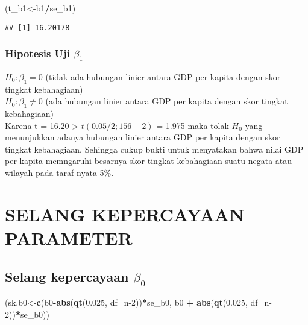 \documentclass[
]{article}
\newenvironment{Shaded}{\begin{snugshade}}{\end{snugshade}}
\newcommand{\AttributeTok}[1]{\textcolor[rgb]{0.13,0.29,0.53}{#1}}
\newcommand{\DecValTok}[1]{\textcolor[rgb]{0.00,0.00,0.81}{#1}}
\newcommand{\FloatTok}[1]{\textcolor[rgb]{0.00,0.00,0.81}{#1}}
\newcommand{\FunctionTok}[1]{\textcolor[rgb]{0.13,0.29,0.53}{\textbf{#1}}}
\newcommand{\NormalTok}[1]{#1}
\newcommand{\OtherTok}[1]{\textcolor[rgb]{0.56,0.35,0.01}{#1}}
\newcommand{\SpecialCharTok}[1]{\textcolor[rgb]{0.81,0.36,0.00}{\textbf{#1}}}
\begin{document}
\begin{Shaded}
\begin{Highlighting}[]
\NormalTok{(t\_b1}\OtherTok{\textless{}{-}}\NormalTok{b1}\SpecialCharTok{/}\NormalTok{se\_b1)}
\end{Highlighting}
\end{Shaded}

\begin{verbatim}
## [1] 16.20178
\end{verbatim}

\hypertarget{hipotesis-uji-beta_1}{%
\subsubsection{\texorpdfstring{ Hipotesis Uji
\(\beta_1\)}{ Hipotesis Uji \textbackslash beta\_1}}\label{hipotesis-uji-beta_1}}

\(H_0:\beta_1=0\) (tidak ada hubungan linier antara GDP per kapita
dengan skor tingkat kebahagiaan)\\
\(H_0:\beta_1≠0\) (ada hubungan linier antara GDP per kapita dengan skor
tingkat kebahagiaan)\\
Karena t = 16.20 \textgreater{} \(t(0.05/2;156-2)\) = 1.975 maka tolak
\(H_0\) yang menunjukkan adanya hubungan linier antara GDP per kapita
dengan skor tingkat kebahagiaan. Sehingga cukup bukti untuk menyatakan
bahwa nilai GDP per kapita memngaruhi besarnya skor tingkat kebahagiaan
suatu negata atau wilayah pada taraf nyata 5\%.

\hypertarget{selang-kepercayaan-parameter}{%
\section{\texorpdfstring{ SELANG KEPERCAYAAN
PARAMETER}{ SELANG KEPERCAYAAN PARAMETER}}\label{selang-kepercayaan-parameter}}

\hypertarget{selang-kepercayaan-beta_0}{%
\subsection{\texorpdfstring{ Selang kepercayaan
\(\beta_0\)}{ Selang kepercayaan \textbackslash beta\_0}}\label{selang-kepercayaan-beta_0}}

\begin{Shaded}
\begin{Highlighting}[]
\NormalTok{(sk.b0}\OtherTok{\textless{}{-}}\FunctionTok{c}\NormalTok{(b0}\SpecialCharTok{{-}}\FunctionTok{abs}\NormalTok{(}\FunctionTok{qt}\NormalTok{(}\FloatTok{0.025}\NormalTok{, }\AttributeTok{df=}\NormalTok{n}\DecValTok{{-}2}\NormalTok{))}\SpecialCharTok{*}\NormalTok{se\_b0, b0 }\SpecialCharTok{+} \FunctionTok{abs}\NormalTok{(}\FunctionTok{qt}\NormalTok{(}\FloatTok{0.025}\NormalTok{, }\AttributeTok{df=}\NormalTok{n}\DecValTok{{-}2}\NormalTok{))}\SpecialCharTok{*}\NormalTok{se\_b0))}
\end{Highlighting}
\end{Shaded}
\end{document}
